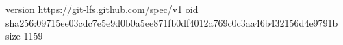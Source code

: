 version https://git-lfs.github.com/spec/v1
oid sha256:09715ee03cdc7e5e9d0b0a5ee871fb0df4012a769c0c3aa46b432156d4e9791b
size 1159
